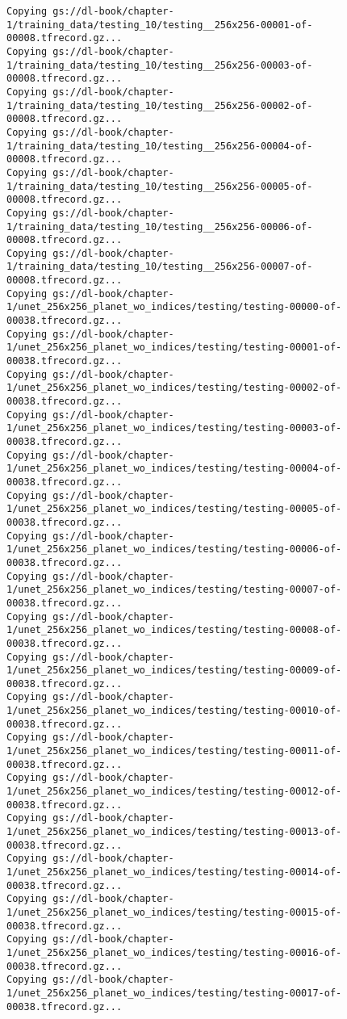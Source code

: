 \documentclass[
  letterpaper,
  DIV=11,
  numbers=noendperiod]{scrreprt}
\begin{document}
\begin{verbatim}
Copying gs://dl-book/chapter-1/training_data/testing_10/testing__256x256-00001-of-00008.tfrecord.gz...
Copying gs://dl-book/chapter-1/training_data/testing_10/testing__256x256-00003-of-00008.tfrecord.gz...
Copying gs://dl-book/chapter-1/training_data/testing_10/testing__256x256-00002-of-00008.tfrecord.gz...
Copying gs://dl-book/chapter-1/training_data/testing_10/testing__256x256-00004-of-00008.tfrecord.gz...
Copying gs://dl-book/chapter-1/training_data/testing_10/testing__256x256-00005-of-00008.tfrecord.gz...
Copying gs://dl-book/chapter-1/training_data/testing_10/testing__256x256-00006-of-00008.tfrecord.gz...
Copying gs://dl-book/chapter-1/training_data/testing_10/testing__256x256-00007-of-00008.tfrecord.gz...
Copying gs://dl-book/chapter-1/unet_256x256_planet_wo_indices/testing/testing-00000-of-00038.tfrecord.gz...
Copying gs://dl-book/chapter-1/unet_256x256_planet_wo_indices/testing/testing-00001-of-00038.tfrecord.gz...
Copying gs://dl-book/chapter-1/unet_256x256_planet_wo_indices/testing/testing-00002-of-00038.tfrecord.gz...
Copying gs://dl-book/chapter-1/unet_256x256_planet_wo_indices/testing/testing-00003-of-00038.tfrecord.gz...
Copying gs://dl-book/chapter-1/unet_256x256_planet_wo_indices/testing/testing-00004-of-00038.tfrecord.gz...
Copying gs://dl-book/chapter-1/unet_256x256_planet_wo_indices/testing/testing-00005-of-00038.tfrecord.gz...
Copying gs://dl-book/chapter-1/unet_256x256_planet_wo_indices/testing/testing-00006-of-00038.tfrecord.gz...
Copying gs://dl-book/chapter-1/unet_256x256_planet_wo_indices/testing/testing-00007-of-00038.tfrecord.gz...
Copying gs://dl-book/chapter-1/unet_256x256_planet_wo_indices/testing/testing-00008-of-00038.tfrecord.gz...
Copying gs://dl-book/chapter-1/unet_256x256_planet_wo_indices/testing/testing-00009-of-00038.tfrecord.gz...
Copying gs://dl-book/chapter-1/unet_256x256_planet_wo_indices/testing/testing-00010-of-00038.tfrecord.gz...
Copying gs://dl-book/chapter-1/unet_256x256_planet_wo_indices/testing/testing-00011-of-00038.tfrecord.gz...
Copying gs://dl-book/chapter-1/unet_256x256_planet_wo_indices/testing/testing-00012-of-00038.tfrecord.gz...
Copying gs://dl-book/chapter-1/unet_256x256_planet_wo_indices/testing/testing-00013-of-00038.tfrecord.gz...
Copying gs://dl-book/chapter-1/unet_256x256_planet_wo_indices/testing/testing-00014-of-00038.tfrecord.gz...
Copying gs://dl-book/chapter-1/unet_256x256_planet_wo_indices/testing/testing-00015-of-00038.tfrecord.gz...
Copying gs://dl-book/chapter-1/unet_256x256_planet_wo_indices/testing/testing-00016-of-00038.tfrecord.gz...
Copying gs://dl-book/chapter-1/unet_256x256_planet_wo_indices/testing/testing-00017-of-00038.tfrecord.gz...

\end{verbatim}
\end{document}
